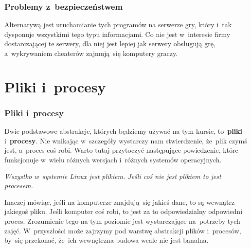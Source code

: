 \documentclass[10pt,t]{beamer}
\begin{document}
\begin{frame}
  \frametitle{Problemy z~bezpieczeństwem}


  Alternatywą jest uruchamianie tych programów na serwerze
  gry, który i~tak dysponuje wszystkimi tego typu informacjami. Co nie jest
  w~interesie firmy dostarczającej te serwery, dla niej jest lepiej jak
  serwery obsługują grę, a~wykrywaniem cheaterów zajmują~się komputery
  graczy.

\end{frame}




















\section{Pliki i~procesy}



\begin{frame}
  \frametitle{Pliki i~procesy}


  Dwie podstawowe abstrakcje, których będziemy używać na tym kursie,
  to~\textbf{pliki} i~\textbf{procesy}. Nie wnikając w~szczegóły wystarczy
  nam stwierdzenie, że~plik czymś jest, a~proces coś robi. Warto tutaj
  przytoczyć następujące powiedzenie, które funkcjonuje w~wielu różnych
  wersjach i~różnych systemów operacyjnych.

  \textit{Wszystko w~systemie Linux jest plikiem. Jeśli coś nie jest
    plikiem to jest procesem.}

  Inaczej mówiąc, jeśli na komputerze znajdują~się jakieś dane, to są
  wewnątrz jakiegoś pliku. Jeśli komputer coś robi, to jest za to
  odpowiedzialny odpowiedni proces. Zrozumienie tego na tym poziomie jest
  wystarczające na~potrzeby tych zajęć. W~przyszłości może zajrzymy pod
  warstwę abstrakcji plików i~procesów, by~się przekonać, że~ich wewnętrzna
  budowa wcale nie jest banalna.

\end{frame}
\end{document}
